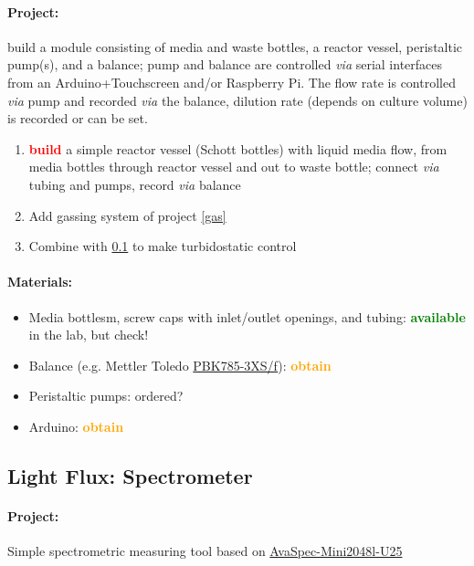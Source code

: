 \documentclass[12pt,a4paper]{scrartcl}
\newcommand{\obtain}[0]{\textcolor{orange}{\textbf{obtain}}}
\newcommand{\avail}[0]{\textcolor{green}{\textbf{available}}}
\newcommand{\build}[0]{\textcolor{red}{\textbf{build}}}
\begin{document}
\paragraph{Project:} build a module consisting of media and waste bottles, a reactor vessel, peristaltic pump(s), and a balance; pump and balance are controlled  \textit{via} serial interfaces from  an Arduino+Touchscreen and/or
Raspberry Pi. The flow rate is controlled \textit{via} pump and
recorded \textit{via} the balance, dilution rate (depends on culture
volume) is recorded or can be set.

\begin{enumerate}
\item \build{} a simple reactor vessel (Schott bottles) with liquid
  media flow, from media bottles through reactor vessel and out to
  waste bottle; connect \textit{via} tubing and pumps, record
  \textit{via} balance
\item Add gassing system of project \ref{gas}
\item Combine with \ref{spec} to make turbidostatic control
\end{enumerate}


\paragraph{Materials:}
\begin{itemize}
\item Media bottlesm, screw caps with inlet/outlet openings,
  and tubing: \avail{} in the lab, but check!
\item Balance (e.g. Mettler Toledo
\href{http://de.mt.com/de/de/home/products/Industrial_Weighing_Solutions/bench-scales/weighing-platforms/high-resolution/PBK785.html}{PBK785-3XS/f}): \obtain{}
\item Peristaltic pumps: ordered?
\item Arduino: \obtain{}
\end{itemize}

\subsection{Light Flux: Spectrometer} 
\label{spec}
\paragraph{Project:} 
Simple spectrometric measuring tool based on
\href{http://www.avantes.com/products/spectrometers/compactline/item/723-avaspec-mini}{AvaSpec-Mini2048l-U25}
\end{document}
